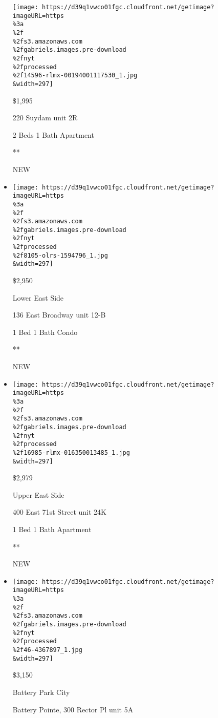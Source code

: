 \begin{itemize}
  \texttt{[image: https://d39q1vwco01fgc.cloudfront.net/getimage?imageURL=https\\\%3a\\\%2f\\\%2fs3.amazonaws.com\\\%2fgabriels.images.pre-download\\\%2fnyt\\\%2fprocessed\\\%2f14596-rlmx-00194001117530\_1.jpg\\\&width=297]}

  \$1,995

  220 Suydam unit 2R

  2 Beds \textbar{} 1 Bath \textbar{} Apartment

  **

  NEW
\item
  \href{/real-estate/usa/ny/new-york/lower-east-side/homes-for-rent/136-east-broadway/8105-OLRS-1594796?}{}

  \texttt{[image: https://d39q1vwco01fgc.cloudfront.net/getimage?imageURL=https\\\%3a\\\%2f\\\%2fs3.amazonaws.com\\\%2fgabriels.images.pre-download\\\%2fnyt\\\%2fprocessed\\\%2f8105-olrs-1594796\_1.jpg\\\&width=297]}

  \$2,950

  Lower East Side

  136 East Broadway unit 12-B

  1 Bed \textbar{} 1 Bath \textbar{} Condo

  **

  NEW
\item
  \href{/real-estate/usa/ny/new-york/upper-east-side/homes-for-rent/400-east-71st-street/16985-RLMX-016350013485?}{}

  \texttt{[image: https://d39q1vwco01fgc.cloudfront.net/getimage?imageURL=https\\\%3a\\\%2f\\\%2fs3.amazonaws.com\\\%2fgabriels.images.pre-download\\\%2fnyt\\\%2fprocessed\\\%2f16985-rlmx-016350013485\_1.jpg\\\&width=297]}

  \$2,979

  Upper East Side

  400 East 71st Street unit 24K

  1 Bed \textbar{} 1 Bath \textbar{} Apartment

  **

  NEW
\item
  \href{/real-estate/usa/ny/new-york/battery-park-city/homes-for-rent/battery-pointe-300-rector-pl/46-4367897?}{}

  \texttt{[image: https://d39q1vwco01fgc.cloudfront.net/getimage?imageURL=https\\\%3a\\\%2f\\\%2fs3.amazonaws.com\\\%2fgabriels.images.pre-download\\\%2fnyt\\\%2fprocessed\\\%2f46-4367897\_1.jpg\\\&width=297]}

  \$3,150

  Battery Park City

  Battery Pointe, 300 Rector Pl unit 5A


\end{itemize}

